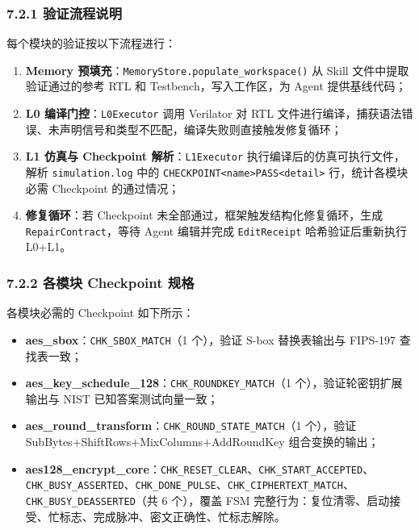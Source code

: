 \subsubsection{7.2.1
验证流程说明}\label{ux9a8cux8bc1ux6d41ux7a0bux8bf4ux660e}

每个模块的验证按以下流程进行：

\begin{enumerate}
\def\labelenumi{\arabic{enumi}.}
\tightlist
\item
  \textbf{Memory 预填充}：\texttt{MemoryStore.populate\_workspace()} 从
  Skill 文件中提取验证通过的参考 RTL 和 Testbench，写入工作区，为 Agent
  提供基线代码；
\item
  \textbf{L0 编译门控}：\texttt{L0Executor} 调用 Verilator 对 RTL
  文件进行编译，捕获语法错误、未声明信号和类型不匹配，编译失败则直接触发修复循环；
\item
  \textbf{L1 仿真与 Checkpoint 解析}：\texttt{L1Executor}
  执行编译后的仿真可执行文件，解析 \texttt{simulation.log} 中的
  \texttt{CHECKPOINT\textbar{}\textless{}name\textgreater{}\textbar{}PASS\textbar{}\textless{}detail\textgreater{}}
  行，统计各模块必需 Checkpoint 的通过情况；
\item
  \textbf{修复循环}：若 Checkpoint
  未全部通过，框架触发结构化修复循环，生成 \texttt{RepairContract}，等待
  Agent 编辑并完成 \texttt{EditReceipt} 哈希验证后重新执行 L0+L1。
\end{enumerate}

\subsubsection{7.2.2 各模块 Checkpoint
规格}\label{ux5404ux6a21ux5757-checkpoint-ux89c4ux683c}

各模块必需的 Checkpoint 如下所示：

\begin{itemize}
\tightlist
\item
  \textbf{aes\_sbox}：\texttt{CHK\_SBOX\_MATCH}（1 个），验证 S-box
  替换表输出与 FIPS-197 查找表一致；
\item
  \textbf{aes\_key\_schedule\_128}：\texttt{CHK\_ROUNDKEY\_MATCH}（1
  个），验证轮密钥扩展输出与 NIST 已知答案测试向量一致；
\item
  \textbf{aes\_round\_transform}：\texttt{CHK\_ROUND\_STATE\_MATCH}（1
  个），验证 SubBytes+ShiftRows+MixColumns+AddRoundKey 组合变换的输出；
\item
  \textbf{aes128\_encrypt\_core}：\texttt{CHK\_RESET\_CLEAR}、\texttt{CHK\_START\_ACCEPTED}、\texttt{CHK\_BUSY\_ASSERTED}、\texttt{CHK\_DONE\_PULSE}、\texttt{CHK\_CIPHERTEXT\_MATCH}、\texttt{CHK\_BUSY\_DEASSERTED}（共
  6 个），覆盖 FSM
  完整行为：复位清零、启动接受、忙标志、完成脉冲、密文正确性、忙标志解除。
\end{itemize}

